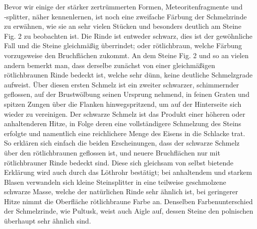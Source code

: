 \documentclass[a4paper, 11pt, oneside, german]{article}
\begin{document}
Bevor wir einige der stärker zertrümmerten Formen, Meteoritenfragmente und ‑splitter, näher kennenlernen, ist noch eine zweifache Färbung der Schmelzrinde zu erwähnen, wie sie an sehr vielen Stücken und besonders deutlich am Steine Fig. 2 zu beobachten ist. Die Rinde ist entweder schwarz, dies ist der gewöhnliche Fall und die Steine gleichmäßig überrindet; oder rötlichbraun, welche Färbung vorzugsweise den Bruchflächen zukommt. An dem Steine Fig. 2 und so an vielen andern bemerkt man, dass derselbe zunächst von einer gleichmäßigen rötlichbraunen Rinde bedeckt ist, welche sehr dünn, keine deutliche Schmelzgrade aufweist. Über diesen ersten Schmelz ist ein zweiter schwarzer, schimmernder geflossen, auf der Brustwölbung seinen Ursprung nehmend, in feinen Graten und spitzen Zungen über die Flanken hinwegspritzend, um auf der Hinterseite sich wieder zu vereinigen. Der schwarze Schmelz ist das Produkt einer höheren oder anhaltenderen Hitze, in Folge deren eine vollständigere Schmelzung des Steins erfolgte und namentlich eine reichlichere Menge des Eisens in die Schlacke trat. So erklären sich einfach die beiden Erscheinungen, dass der schwarze Schmelz über den rötlichbraunen geflossen ist, und neuere Bruchflächen nur mit rötlichbrauner Rinde bedeckt sind. Diese sich gleichsam von selbst bietende Erklärung wird auch durch das Löthrohr bestätigt; bei anhaltendem und starkem Blasen verwandeln sich kleine Steinsplitter in eine teilweise geschmolzene schwarze Masse, welche der natürlichen Rinde sehr ähnlich ist, bei geringerer Hitze nimmt die Oberfläche rötlichbraune Farbe an. Denselben Farbenunterschied der Schmelzrinde, wie Pultusk, weist auch Aigle auf, dessen Steine den polnischen überhaupt sehr ähnlich sind.
\end{document}
